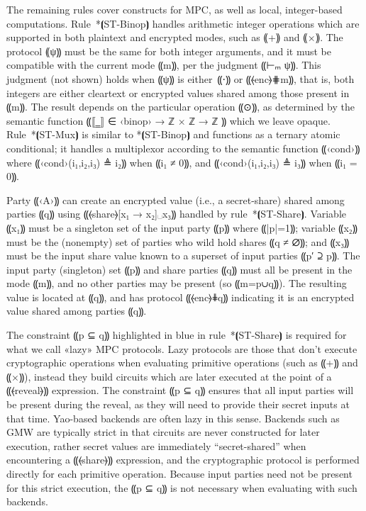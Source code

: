 The remaining rules cover constructs for MPC, as well as local,
integer-based computations.
%
Rule~*⦗ST-Binop⦘ handles arithmetic integer operations which are supported in
both plaintext and encrypted modes, such as ⸨+⸩ and ⸨×⸩. The protocol
⸨ψ⸩ must be the same for both integer arguments, and it must be compatible with the
current mode ⸨m⸩, per the judgment ⸨⊢ₘ ψ⸩. This judgment (not shown) holds when ⸨ψ⸩ is
either~⸨⋅⸩ or ⸨⦑enc⦒⋕m⸩, that is, both integers are either cleartext or
encrypted values shared among those present in ⸨m⸩. The result depends on the
particular operation ⸨⊙⸩, as determined by the semantic function ⸨⟦‗⟧ ∈ ‹binop›
→ ℤ × ℤ → ℤ ⸩ which we leave opaque.
Rule~*⦗ST-Mux⦘ is similar to *⦗ST-Binop⦘ and functions as a ternary atomic
conditional; it handles a multiplexor according to the semantic function
⸨‹cond›⸩ where ⸨‹cond›(i₁,i₂,i₃) ≜ i₂⸩ when ⸨i₁ ≠ 0⸩, and ⸨‹cond›(i₁,i₂,i₃) ≜ i₃⸩
when ⸨i₁ = 0⸩.

Party ⸨‹A›⸩ can create an encrypted value (i.e., a
secret-share) shared among parties ⸨q⸩ using ⸨⦑share⦒[x₁ → x₂]␣x₃⸩ handled by
rule~*⦗ST-Share⦘. Variable ⸨x₁⸩ must be a singleton set of the input party
⸨p⸩ where ⸨|p|=1⸩; variable ⸨x₂⸩ must be the (nonempty) set of parties
who wild hold shares ⸨q ≠ ∅⸩; and
⸨x₃⸩ must be the input share value known to a superset of input parties ⸨p′ ⊇ p⸩.
The input party (singleton) set ⸨p⸩ and share parties ⸨q⸩ must all be present in
the mode ⸨m⸩, and no other parties may be present (so ⸨m=p∪q⸩). The resulting
value is located at ⸨q⸩, and has protocol ⸨⦑enc⦒⋕q⸩ indicating it is an
encrypted value shared among parties ⸨q⸩.

The constraint ⸨p ⊆ q⸩ highlighted in blue in rule~*⦗ST-Share⦘
is required for what we call «lazy» MPC protocols. Lazy protocols are those that
don't execute cryptographic operations when evaluating primitive operations
(such as ⸨+⸩ and ⸨×⸩), instead they build circuits which are later executed at
the point of a ⸨⦑reveal⦒⸩ expression. The constraint ⸨p ⊆ q⸩ ensures that all
input parties will be present during the reveal, as they will need to provide
their secret inputs at that time. Yao-based backends are often lazy
in this sense. Backends such as GMW are typically strict in that circuits are
never constructed for later execution, rather secret values are immediately
“secret-shared” when encountering a ⸨⦑share⦒⸩ expression, and the cryptographic
protocol is performed directly for each primitive operation. Because input
parties need not be present for this strict execution, the ⸨p ⊆ q⸩ is not
necessary when evaluating with such backends.

